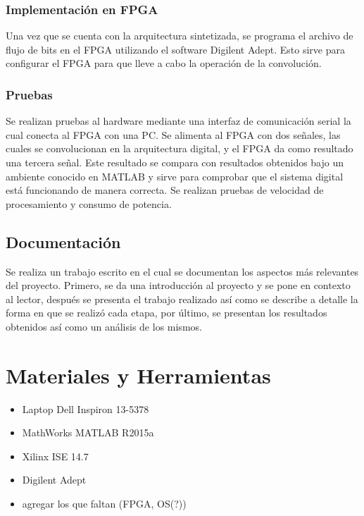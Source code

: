 \subsubsection{Implementación en FPGA}
Una vez que se cuenta con la arquitectura sintetizada, se programa el archivo de flujo de bits en el FPGA utilizando el software Digilent Adept. Esto sirve para configurar el FPGA para que lleve a cabo la operación de la convolución.

\subsubsection{Pruebas}
Se realizan pruebas al hardware mediante una interfaz de comunicación serial la cual conecta al FPGA con una PC. Se alimenta al FPGA con dos señales, las cuales se convolucionan en la arquitectura digital, y el FPGA da como resultado una tercera señal. Este resultado se compara con resultados obtenidos bajo un ambiente conocido en MATLAB y sirve para comprobar que el sistema digital está funcionando de manera correcta. Se realizan pruebas de velocidad de procesamiento y consumo de potencia.

\subsection{Documentación}
Se realiza un trabajo escrito en el cual se documentan los aspectos más relevantes del proyecto. Primero, se da una introducción al proyecto y se pone en contexto al lector, después se presenta el trabajo realizado así como se describe a detalle la forma en que se realizó cada etapa, por último, se presentan los resultados obtenidos así como un análisis de los mismos. 

\section{Materiales y Herramientas}
\begin{itemize}
\item Laptop Dell Inspiron 13-5378
\item MathWorks MATLAB R2015a
\item Xilinx ISE 14.7
\item Digilent Adept
\color{red}
\item agregar los que faltan (FPGA, OS(?))
\end{itemize}
